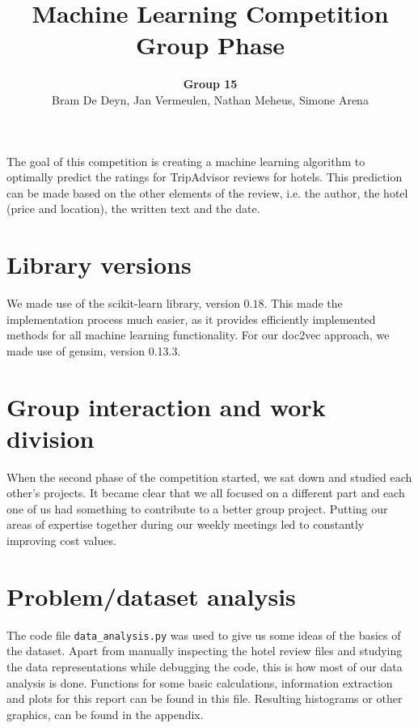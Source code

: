 \documentclass[a4paper,12pt]{article}
\begin{document}
\title{
\textbf{Machine Learning Competition} \\
\textbf{Group Phase} \\
}
\author{
\textbf{Group 15} \\
Bram De Deyn,
Jan Vermeulen,
Nathan Meheus,
Simone Arena}
\maketitle
{}

The goal of this competition is creating a machine learning algorithm to optimally predict the ratings for TripAdvisor reviews for hotels. This prediction can be made based on the other elements of the review, i.e. the author, the hotel (price and location), the written text and the date.

\section{Library versions}

We made use of the scikit-learn library, version $0.18$. This made the implementation process much easier, as it provides efficiently implemented methods for all machine learning functionality.
For our doc2vec approach, we made use of gensim, version 0.13.3.

\section{Group interaction and work division}

When the second phase of the competition started, we sat down and studied each other's projects. It became clear that we all focused on a different part and each one of us had something to contribute to a better group project. Putting our areas of expertise together during our weekly meetings led to constantly improving cost values.

\section{Problem/dataset analysis}

The code file \texttt{data\_analysis.py} was used to give us some ideas of the basics of the dataset. Apart from manually inspecting the hotel review files and studying the data representations while debugging the code, this is how most of our data analysis is done. Functions for some basic calculations, information extraction and plots for this report can be found in this file. Resulting histograms or other graphics, can be found in the appendix.
\end{document}
